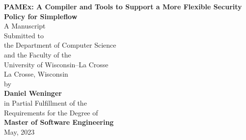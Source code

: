 \begin{titlepage}
	\begin{center}
		\vspace*{0.5in}
		\begin{doublespace}
			\LARGE \textbf{PAMEx: A Compiler and Tools to Support a More Flexible Security Policy for Simpleflow} \\
			\vspace*{1in}
			\normalsize
			A Manuscript \\
			Submitted to \\
			the Department of Computer Science \\
			and the Faculty of the\\
			University of Wisconsin--La Crosse \\
			La Crosse, Wisconsin \\
			\vspace*{0.5in}
			by \\
			\large
			\textbf{Daniel Weninger} \\

			\vspace*{0.5in}
			\normalsize
			in Partial Fulfillment of the \\
			Requirements for the Degree of\\
			\Large{\textbf{Master of Software Engineering}} \\
			\normalsize
			May, 2023
		\end{doublespace}
	\end{center}
\end{titlepage}
